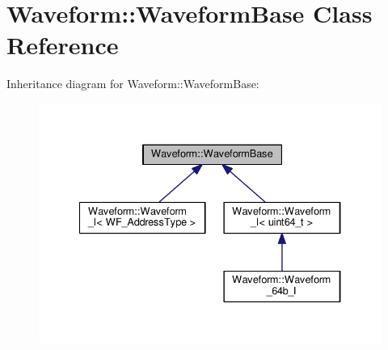 \hypertarget{class_waveform_1_1_waveform_base}{}\section{Waveform\+:\+:Waveform\+Base Class Reference}
\label{class_waveform_1_1_waveform_base}


Inheritance diagram for Waveform\+:\+:Waveform\+Base\+:\nopagebreak
\begin{figure}[H]
\begin{center}
\leavevmode
\includegraphics[width=334pt]{class_waveform_1_1_waveform_base__inherit__graph}
\end{center}
\end{figure}

